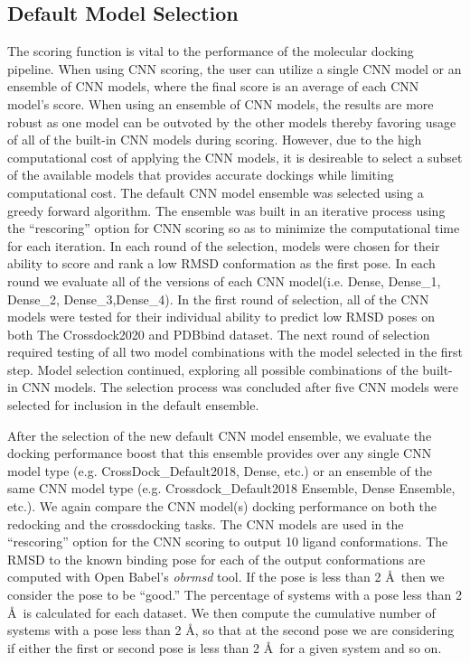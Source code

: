 \documentclass[journal=jcisd8,manuscript=article]{achemso}
\begin{document}
\subsection{Default Model Selection}
The scoring function is vital to the performance of the molecular docking pipeline. When using CNN scoring, the user can utilize a single CNN model or an ensemble of CNN models, where the final score is an average of each CNN model's score. When using an ensemble of CNN models, the results are more robust as one model can be outvoted by the other models thereby favoring usage of all of the built-in CNN models during scoring. However, due to the high computational cost of applying the CNN models, it is desireable to select a subset of the available models that provides accurate dockings while limiting computational cost. The default CNN model ensemble was selected using a greedy forward algorithm. The ensemble was built in an iterative process using the ``rescoring'' option for CNN scoring so as to minimize the computational time for each iteration. In each round of the selection, models were chosen for their ability to score and rank a low RMSD conformation as the first pose. In each round we evaluate all of the versions of each CNN model(i.e. Dense, Dense\_1, Dense\_2, Dense\_3,Dense\_4). In the first round of selection, all of the CNN models were tested for their individual ability to predict low RMSD poses on both The Crossdock2020 and PDBbind dataset. The next round of selection required testing of all two model combinations with the model selected in the first step. Model selection continued, exploring all possible combinations of the built-in CNN models. The selection process was concluded after five CNN models were selected for inclusion in the default ensemble.

After the selection of the new default CNN model ensemble, we evaluate the docking performance boost that this ensemble provides over any single CNN model type (e.g. CrossDock\_Default2018, Dense, etc.) or an ensemble of the same CNN model type (e.g. Crossdock\_Default2018 Ensemble, Dense Ensemble, etc.). We again compare the CNN model(s) docking performance on both the redocking and the crossdocking tasks. The CNN models are used in the ``rescoring'' option for the CNN scoring to output 10 ligand conformations. The RMSD to the known binding pose for each of the output conformations are computed with Open Babel's \textit{obrmsd} tool. If the pose is less than 2 \AA~then we consider the pose to be ``good.'' The percentage of systems with a pose less than 2 \AA~is calculated for each dataset. We then compute the cumulative number of systems with a pose less than 2 \AA, so that at the second pose we are considering if either the first or second pose is less than 2 \AA~for a given system and so on.
\end{document}
